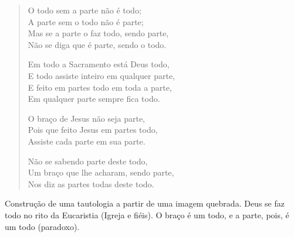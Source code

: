 \begin{verse}
O todo sem a parte não é todo; \\
A parte sem o todo não é parte; \\
Mas se a parte o faz todo, sendo parte, \\
Não se diga que é parte, sendo o todo. 
				
Em todo a Sacramento está Deus todo, \\
E todo assiste inteiro em qualquer parte, \\
E feito em partes todo em toda a parte, \\
Em qualquer parte sempre fica todo. 
				
O braço de Jesus não seja parte, \\
Pois que feito Jesus em partes todo, \\
Assiste cada parte em sua parte.
				
Não se sabendo parte deste todo, \\
Um braço que lhe acharam, sendo parte, \\
Nos diz as partes todas deste todo. 
\end{verse}

Construção de uma tautologia a partir de uma imagem quebrada. Deus se faz todo no rito da Eucaristia (Igreja e fiéis). O braço é um todo, e a parte, pois, é um todo (paradoxo).

